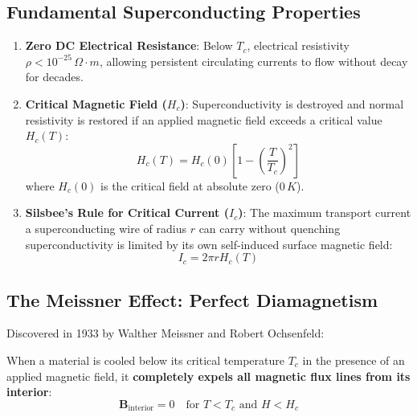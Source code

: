 \subsection{Fundamental Superconducting Properties}
\begin{enumerate}
    \item \textbf{Zero DC Electrical Resistance}: Below $T_c$, electrical resistivity $\rho < 10^{-25}\,\si{\Omega\cdot m}$, allowing persistent circulating currents to flow without decay for decades.
    \item \textbf{Critical Magnetic Field ($H_c$)}: Superconductivity is destroyed and normal resistivity is restored if an applied magnetic field exceeds a critical value $H_c(T)$:
    \begin{equation}
        H_c(T) = H_c(0)\left[ 1 - \left(\frac{T}{T_c}\right)^2 \right]
    \end{equation}
    where $H_c(0)$ is the critical field at absolute zero ($0\,\si{K}$).
    \item \textbf{Silsbee's Rule for Critical Current ($I_c$)}: The maximum transport current a superconducting wire of radius $r$ can carry without quenching superconductivity is limited by its own self-induced surface magnetic field:
    \begin{equation}
        I_c = 2\pi r H_c(T)
    \end{equation}
\end{enumerate}

\subsection{The Meissner Effect: Perfect Diamagnetism}
Discovered in 1933 by Walther Meissner and Robert Ochsenfeld:

\begin{definition}
When a material is cooled below its critical temperature $T_c$ in the presence of an applied magnetic field, it \textbf{completely expels all magnetic flux lines from its interior}:
\begin{equation}
    \mathbf{B}_{\text{interior}} = 0 \quad \text{for } T < T_c \text{ and } H < H_c
\end{equation}
\end{definition}

